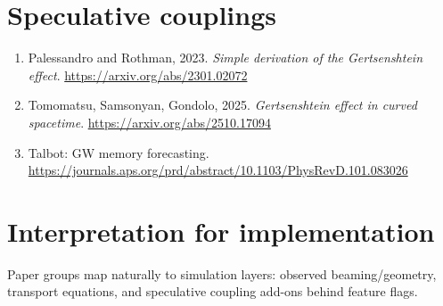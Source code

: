 \documentclass[11pt]{article}
\begin{document}
\section{Speculative couplings}
\begin{enumerate}
\item Palessandro and Rothman, 2023. \emph{Simple derivation of the Gertsenshtein effect}. \url{https://arxiv.org/abs/2301.02072}
\item Tomomatsu, Samsonyan, Gondolo, 2025. \emph{Gertsenshtein effect in curved spacetime}. \url{https://arxiv.org/abs/2510.17094}
\item Talbot: GW memory forecasting. \url{https://journals.aps.org/prd/abstract/10.1103/PhysRevD.101.083026}
\end{enumerate}

\section{Interpretation for implementation}
Paper groups map naturally to simulation layers: observed beaming/geometry, transport equations, and speculative coupling add-ons behind feature flags.
\end{document}
